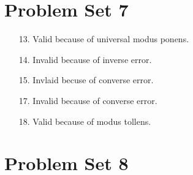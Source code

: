 \documentclass[12pt]{article}
\begin{document}
\section*{Problem Set 7}
\begin{itemize}
    \item [13.]
        Valid because of universal modus ponens.
    \item [14.]
        Invalid because of inverse error.
    \item [15.]
        Invlaid becuse of converse error.
    \item [17.]
        Invalid because of converse error.
    \item [18.]
        Valid because of modus tollens.
\end{itemize}

\section*{Problem Set 8}
\end{document}
